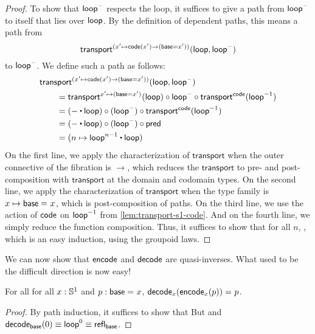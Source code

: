 \begin{proof}
To show that $\mathsf{loop}^{\mathord{\hspace{1pt}\text{--}\hspace{1pt}}}$ respects the loop, it suffices to give a path
from $\mathsf{loop}^{\mathord{\hspace{1pt}\text{--}\hspace{1pt}}}$ to itself that lies over $\mathsf{loop}$. 
By the definition of dependent paths, this means a path from
\[\mathsf{transport}^{(x' \mapsto \mathsf{code}(x') \rightarrow (\mathsf{base}=x'))}(\mathsf{loop},\mathsf{loop}^{\mathord{\hspace{1pt}\text{--}\hspace{1pt}}})\]
to $\mathsf{loop}^{\mathord{\hspace{1pt}\text{--}\hspace{1pt}}}$.  We define such a
path as follows:
\begin{align*}
  \MoveEqLeft \transfib {(x' \mapsto \code(x') \rightarrow (\base=x'))} \lloop {\lloop^{\blank}}\\
&= \transfibf {x'\mapsto (\base=x')}(\lloop) \circ {\lloop^{\blank}} \circ \transfibf \code ({\opp \lloop}) \\
&= (- \ct \lloop) \circ (\lloop^{\blank}) \circ \transfibf \code ({\opp \lloop}) \\
&= (- \ct \lloop) \circ (\lloop^{\blank}) \circ \Zpred \\
&= (n \mapsto \lloop^{n - 1} \ct \lloop)                 
\end{align*}
On the first line, we apply the characterization of $\mathsf{transport}$
when the outer connective of the fibration is $\rightarrow$, which
reduces the $\mathsf{transport}$ to pre- and post-composition with
$\mathsf{transport}$ at the domain and codomain types.  On the second line,
we apply the characterization of $\mathsf{transport}$ when the type family
is $x\mapsto \mathsf{base} =_{} x$, which is post-composition of paths.  On the third line,
we use the action of $\mathsf{code}$ on $\mathord{{\mathsf{loop}}^{-1}}$ from
\autoref{lem:transport-s1-code}.  And on the fourth line, we simply
reduce the function composition.  Thus, it suffices to show that for all
$n$, , which is an easy
induction, using the groupoid laws.  
\end{proof}

We can now show that $\mathsf{encode}$ and $\mathsf{decode}$ are quasi-inverses.
What used to be the difficult direction is now easy!

\begin{lem} \label{lem:s1-decode-encode}  For all 
for all $x: \mathbb{S} ^1$ and $p : \mathsf{base} =_{} x$, $\mathsf{decode}_x({{\mathsf{encode}_x(p)}}) =_{} p$.  
\end{lem}

\begin{proof}
By path induction, it suffices to show that 
But
and $\mathsf{decode}_{\mathsf{base}}(0) \equiv \mathsf{loop}^ 0 \equiv \mathsf{refl}_{\mathsf{base}}$.  
\end{proof}


